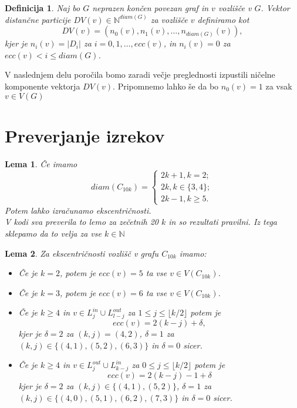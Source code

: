 \documentclass[a4paper, 12pt]{article}
\newtheorem{definicija}{Definicija}[section]
\newtheorem{lema}{Lema}[section]
\begin{document}
\begin{definicija}
    Naj bo $G$ neprazen končen povezan graf in $v$ vozlišče v $G$. Vektor distančne particije $DV(v) \in \mathbb{N}^{diam(G)}$ za vozlišče $v$
    definiramo kot
    $$
    DV(v) = (n_{0}(v), n_{1}(v), \dots , n_{diam(G)}(v)),
    $$
    kjer je $n_{i}(v) = |D_{i}|$ za $i=0,1, \dots , ecc(v)$, in $n_{i}(v) = 0$ za $ecc(v) < i \leq diam(G)$.
\end{definicija}

V naslednjem delu poročila bomo zaradi večje preglednosti izpustili ničelne komponente vektorja $DV(v)$. Pripomnemo lahko še 
da bo $n_{0}(v) = 1$ za vsak $v \in V(G)$

\section{Preverjanje izrekov}

\begin{lema}
    Če imamo 
    $$
    diam(C_{10k}) = \begin{cases}
                    2k+1, k=2;\\
                    2k, k \in \{3,4\};\\
                    2k-1, k \geq 5.

                    \end{cases}
    $$
    Potem lahko izračunamo ekscentričnosti. \\
    V kodi sva preverila to lemo za zečetnih 20 $k$ in so rezultati pravilni. Iz tega sklepamo da to velja za vse $k \in \mathbb{N}$
\end{lema}

\begin{lema}
    Za ekscentričnosti vozlišč v grafu $C_{10k}$ imamo:
    \begin{itemize}
        \item Če je $k=2$, potem je $ecc(v) = 5$ ta vse $v \in V(C_{10k})$.
        \item Če je $k=3$, potem je $ecc(v) = 6$ ta vse $v \in V(C_{10k})$.
        \item Če je $k \geq 4$ in $v \in L_{j}^{in} \cup L_{l-j}^{out}$ za $1 \leq j \leq \lfloor k/2 \rfloor$ potem je $$ecc(v) = 2(k-j) + \delta,$$
              kjer je $\delta = 2 $ za $(k,j) = (4,2)$, $\delta = 1$ za $(k , j) \in \{(4,1), (5,2), (6,3) \}$ in $\delta = 0$ sicer.
        \item Če je $k \geq 4$ in $v \in L_{j}^{out} \cup L_{k-j}^{in}$ za $0 \leq j \leq \lfloor k/2 \rfloor$ potem je $$ecc(v) = 2(k-j) - 1 +\delta$$
        kjer je $\delta = 2 $ za $(k,j) \in \{(4,1), (5,2)\}$, $\delta = 1$ za $(k , j) \in \{(4,0), (5,1), (6,2), (7,3) \}$ in $\delta = 0$ sicer.
    \end{itemize}
\end{lema}
\end{document}

